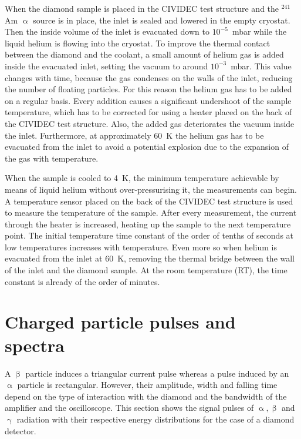When the diamond sample is placed in the CIVIDEC test structure and the $^{241}$Am $\upalpha$ source is in place, the inlet is sealed and lowered in the empty cryostat. Then the inside volume of the inlet is evacuated down to $10^{-5}$~mbar while the liquid helium is flowing into the cryostat. To improve the thermal contact between the diamond and the coolant, a small amount of helium gas is added inside the evacuated inlet, setting the vacuum to around $10^{-3}$~mbar. This value changes with time, because the gas condenses on the walls of the inlet, reducing the number of floating particles. For this reason the helium gas has to be added on a regular basis. Every addition causes a significant undershoot of the sample temperature, which has to be corrected for using a heater placed on the back of the CIVIDEC test structure. Also, the added gas deteriorates the vacuum inside the inlet. 
Furthermore, at approximately 60~K the helium gas has to be evacuated from the inlet to avoid a potential explosion due to the expansion of the gas with temperature. 

When the sample is cooled to 4~K, the minimum temperature achievable by means of liquid helium without over-pressurising it, the measurements can begin. A temperature sensor placed on the back of the CIVIDEC test structure is used to measure the temperature of the sample. After every measurement, the current through the heater is increased, heating up the sample to the next temperature point. The initial temperature time constant of the order of tenths of seconds at low temperatures increases with temperature. Even more so when helium is evacuated from the inlet at 60~K, removing the thermal bridge between the wall of the inlet and the diamond sample. At the room temperature (RT), the time constant is already of the order of minutes.

\section{Charged particle pulses and spectra}
\label{sec:pulsespectra}
A $\upbeta$ particle induces a triangular current pulse whereas a pulse induced by an $\upalpha$ particle is rectangular. However, their amplitude, width and falling time depend on the type of interaction with the diamond and the bandwidth of the amplifier and the oscilloscope. This section shows the signal pulses of $\upalpha, \upbeta$ and $\upgamma$ radiation with their respective energy distributions for the case of a diamond detector. %

